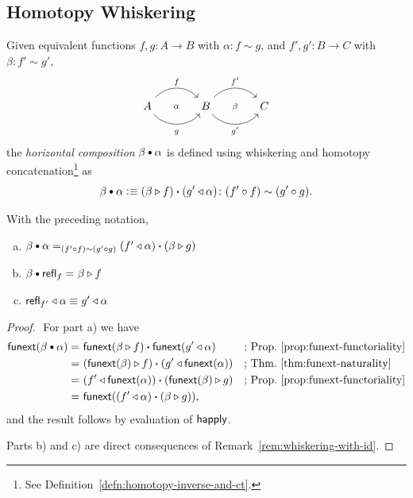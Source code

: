 \subsection*{Homotopy Whiskering}\label{homotopy-whiskering}
Given equivalent functions $f,g\colon A\to B$ with $\alpha\colon f\sim g$, and $f',g'\colon B\to C$ with $\beta\colon f'\sim g'$,
\[
    \begin{tikzcd}[column sep=large]
        A
                \arrow[r,"f",bend left=49]
                \arrow[r,"g\vphantom'"',bend right=49]
                \arrow[r,"\scriptstyle\alpha",phantom]
            &B
                \arrow[r,"f'",bend left=49]
                \arrow[r,"g'"',bend right=49]
                \arrow[r,"\scriptstyle\beta",phantom]
            &C
    \end{tikzcd}
\]
the \textsl{horizontal composition} $\beta\hct\alpha$ is defined using whiskering and homotopy concatenation\footnote{See Definition~\ref{defn:homotopy-inverse-and-ct}.} as
\[
    \beta\hct\alpha\defeq(\beta\rwct f)\ct(g'\lwct\alpha)
        \colon(f'\circ f)\sim(g'\circ g). 
\]

\begin{prop}\label{prop:homotopy-whiskering}\fe
    With the preceding notation,
    \begin{enumerate}[a),font=\upshape]
        \item $\beta\hct\alpha\eq{(f'\circ f)\sim(g'\circ g)}(f'\lwct\alpha)\ct(\beta\rwct g)$
    \item $\beta\hct\fun{refl}_f\eq{}\beta\rwct f$
    \item $\mathsf{refl}_{f'}\triangleleft\alpha\equiv g'\triangleleft\alpha$
    \end{enumerate}
\end{prop}

\begin{proof}${}$
    For part a) we have
    \begin{align*}
        \fun{funext}(\beta\hct\alpha)
            &\eq{}\fun{funext}(\beta\rwct f)
                \ct\fun{funext}(g'\lwct\alpha)
                &&\text{; Prop.~\ref{prop:funext-functoriality}}\\
            &\eq{}(\fun{funext}(\beta)\rwct f)
                \ct(g'\lwct\fun{funext}(\alpha))
                &&\text{; Thm.~\ref{thm:funext-naturality}}\\
            &\eq{}(f'\lwct\fun{funext}(\alpha))
                \ct(\fun{funext}(\beta)\rwct g)
                &&\text{; Prop.~\ref{prop:funext-functoriality}}\\
            &\eq{}\fun{funext}((f'\lwct\alpha)\ct(\beta\rwct g)),
    \end{align*}
    and the result follows by evaluation of $\mathsf{happly}$.

    Parts b) and c) are direct consequences of Remark~\ref{rem:whiskering-with-id}.
\end{proof}

